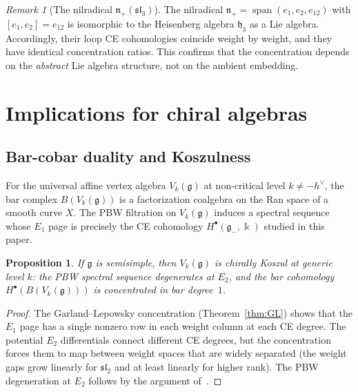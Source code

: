 \documentclass[11pt,reqno]{amsart}
\theoremstyle{plain}
\newtheorem{proposition}[theorem]{Proposition}
\theoremstyle{definition}
\theoremstyle{remark}
\newtheorem{remark}[theorem]{Remark}
\newcommand{\fg}{\mathfrak{g}}
\newcommand{\fh}{\mathfrak{h}}
\newcommand{\fn}{\mathfrak{n}}
\newcommand{\gminus}{\fg_{-}}
\newcommand{\kk}{\Bbbk}
\begin{document}
\begin{remark}[The nilradical $\fn_+(\mathfrak{sl}_3)$]\label{rem:nilrad}
 The nilradical $\fn_+ = \operatorname{span}(e_1, e_2, e_{12})$ with
 $[e_1, e_2] = e_{12}$ is isomorphic to the Heisenberg algebra $\fh_3$ as
 a Lie algebra. Accordingly, their loop CE cohomologies coincide weight by
 weight, and they have identical concentration ratios. This confirms that
 the concentration depends on the \emph{abstract} Lie algebra structure,
 not on the ambient embedding.
\end{remark}


\section{Implications for chiral algebras}
\label{sec:chiral}

\subsection{Bar-cobar duality and Koszulness}

For the universal affine vertex algebra $V_k(\fg)$ at non-critical level
$k \neq -h^\vee$, the bar complex $B(V_k(\fg))$ is a factorization coalgebra
on the Ran space of a smooth curve $X$. The PBW filtration on $V_k(\fg)$
induces a spectral sequence whose $E_1$ page is precisely the CE cohomology
$H^\bullet(\gminus, \kk)$ studied in this paper.

\begin{proposition}\label{prop:koszul-from-concentration}
 If $\fg$ is semisimple, then $V_k(\fg)$ is chirally Koszul at generic
 level $k$: the PBW spectral sequence degenerates at $E_2$, and the bar
 cohomology $H^\bullet(B(V_k(\fg)))$ is concentrated in bar degree~$1$.
\end{proposition}

\begin{proof}
 The Garland--Lepowsky concentration (Theorem~\ref{thm:GL}) shows that
 the $E_1$ page has a single nonzero row in each weight column at each
 CE degree. The potential $E_2$ differentials connect different CE
 degrees, but the concentration forces them to map between weight spaces
 that are widely separated (the weight gaps grow linearly for
 $\mathfrak{sl}_2$ and at least linearly for higher rank). The PBW
 degeneration at $E_2$ follows by the argument of~\cite[Proposition
 4.2.1]{L-MKD}.
\end{proof}
\end{document}
